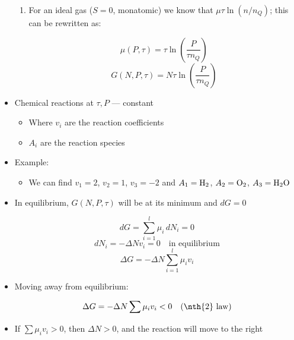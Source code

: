 \begin{itemize}
\begin{enumerate}
        \item For an ideal gas ($S=0$, monatomic) we know that $\mu\tau\ln\left( n/n_Q \right)$; this can be rewritten as:

          $$\mu(P,\tau)=\tau\ln\left( \frac{P}{\tau n_Q} \right)$$
          $$G(N,P,\tau)=N\tau\ln\left( \frac{P}{\tau n_Q} \right)$$

    \end{enumerate}

  \item Chemical reactions at $\tau,P$ — constant

    \begin{center}
    \end{center}

    \begin{itemize}

      \item Where $v_i$ are the reaction coefficients

      \item $A_i$ are the reaction species

    \end{itemize}

  \item Example:

    \begin{center}
    \end{center}

    \begin{itemize}

      \item We can find $v_1=2$, $v_2=1$, $v_3=-2$ and $A_1=\ce{H2}$, $A_2=\ce{O2}$, $A_3=\ce{H2O}$

    \end{itemize}

  \item In equilibrium, $G(N,P,\tau)$ will be at its minimum and $dG=0$

    $$dG=\sum_{i=1}^l\mu_i\,dN_i=0$$
    $$dN_i=-\Delta N v_i=0\quad\text{in equilibrium}$$
    $$\Delta G=-\Delta N\sum_{i=1}^l\mu_iv_i$$

  \item Moving away from equilibrium:

    $$\Delta G=-\Delta N\sum\mu_iv_i<0\quad\text{(\nth{2} law)}$$

  \item If $\sum\mu_iv_i>0$, then $\Delta N>0$, and the reaction will move to the right


\end{itemize}
